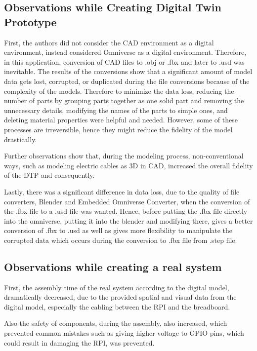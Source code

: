 \documentclass[conference]{IEEEtran}
\begin{document}
    \subsection{Observations while Creating Digital Twin Prototype}

    First, the authors did not consider the CAD environment as a digital environment, instead considered Omniverse as a digital environment. Therefore, in this application, conversion of CAD files to .obj or .fbx and later to .usd was inevitable. The results of the conversions show that a significant amount of model data gets lost, corrupted, or duplicated during the file conversions because of the complexity of the models. Therefore to minimize the data loss, reducing the number of parts by grouping parts together as one solid part and removing the unnecessary details, modifying the names of the parts to simple ones, and deleting material properties were helpful and needed. However, some of these processes are irreversible, hence they might reduce the fidelity of the model drastically.

    Further observations show that, during the modeling process, non-conventional ways, such as modeling electric cables as 3D in CAD, increased the overall fidelity of the DTP and consequently.

    Lastly, there was a significant difference in data loss, due to the quality of file converters, Blender and Embedded Omniverse Converter, when the conversion of the .fbx file to a .usd file was wanted. Hence, before putting the .fbx file directly into the omniverse, putting it into the blender and modifying there,  gives a better conversion of .fbx to .usd as well as gives more flexibility to manipulate the corrupted data which occurs during the conversion to .fbx file from .step file.

    \subsection{Observations while creating a real system}

    First, the assembly time of the real system according to the digital model, dramatically decreased, due to the provided spatial and visual data from the digital model, especially the cabling between the RPI and the breadboard. 

    Also the safety of components, during the assembly, also increased, which prevented common mistakes such as giving higher voltage to GPIO pins, which could result in damaging the RPI, was prevented. 
\end{document}
